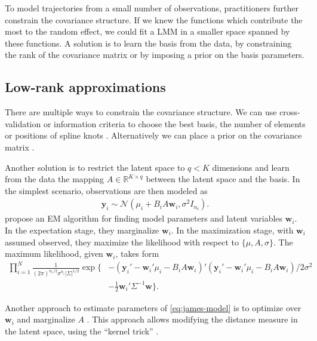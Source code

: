\documentclass[preprint]{imsart}
\numberwithin{equation}{section}
\theoremstyle{plain}
\newcommand{\cN}{\mathcal{N}}
\newcommand{\R}{\mathbb{R}}
\newcommand{\by}{\mathbf{y}}
\newcommand{\bb}{\mathbf{b}}
\newcommand{\bw}{\mathbf{w}}
\begin{document}
To model trajectories from a small number of observations, practitioners further constrain the covariance structure. If we knew the functions which contribute the most to the random effect, we could fit a LMM in a smaller space spanned by these functions. A solution is to learn the basis from the data, by constraining the rank of the covariance matrix or by imposing a prior on the basis parameters.

\subsection{Low-rank approximations}\label{ss:reduced-rank}

There are multiple ways to constrain the covariance structure. We can use cross-validation or information criteria to choose the best basis, the number of elements or positions of spline knots \citep{rice2001nonparametric,bigelow2009bayesian}. Alternatively we can place a prior on the covariance matrix \citep{maclehose2009nonparametric}.

Another solution is to restrict the latent space to $q < K$ dimensions and learn from the data the mapping $A \in \R^{K \times q}$ between the latent space and the basis. In the simplest scenario, observations are then modeled as
\begin{align}\label{eq:james-model}
 \mathbf{y}_i \sim \cN(\mu_i + B_i A \mathbf{w}_i, \sigma^2I_{n_i}).
\end{align}
\citet{james2000principal} propose an EM algorithm for finding model parameters and latent variables $\bw_i$. In the expectation stage, they marginalize $\bw_i$. %
In the maximization stage, with $\bw_i$ assumed observed, they maximize the likelihood with respect to $\{\mu,A,\sigma\}$. The maximum likelihood, given $\bw_i$, takes form
\begin{align}
\prod_{i=1}^N \frac{1}{(2\pi)^{n_i/2} \sigma^{n_i} |\Sigma|^{1/2}} \exp\{ &-(\by_i' - \bw_i'\mu_i - B_i A \bw_i)'(\by_i' - \bw_i'\mu_i - B_i A \bw_i) / 2\sigma^2 \nonumber\\
&- \frac{1}{2}\bw_i' \Sigma^{-1} \bw \}.\label{eq:likelihood}
\end{align}

Another approach to estimate parameters of \eqref{eq:james-model} is to optimize over $\bw_i$ and marginalize $A$ \citep{lawrence2004gaussian}. This approach allows modifying the distance measure in the latent space, using the ``kernel trick'' \citep{schulam2016disease}.
\end{document}
